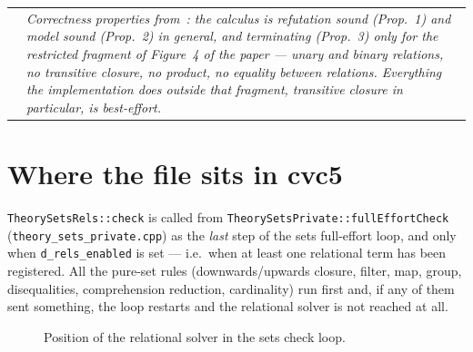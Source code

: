 \documentclass[11pt,a4paper]{article}
\makeatletter
\newcommand{\code}[1]{\texttt{\small #1}}
\newcommand{\file}[1]{\texttt{\small #1}}
\theoremstyle{definition}
\newenvironment{sidenote}
  {\par\medskip\noindent\begin{tabular}{@{}p{0.02\textwidth}@{\hspace{4pt}}p{0.93\textwidth}@{}}
   \raisebox{-1pt}{\color{hl}\Large$\vartriangleright$} &\itshape}
  {\end{tabular}\par\medskip}
\makeatother
\begin{document}
\begin{sidenote}
Correctness properties from~\cite{MRT17}: the calculus is refutation sound
(Prop.~1) and model sound (Prop.~2) in general, and terminating (Prop.~3) only
for the restricted fragment of Figure~4 of the paper --- unary and binary
relations, no transitive closure, no product, no equality between relations.
Everything the implementation does outside that fragment, transitive closure
in particular, is best-effort.
\end{sidenote}

\section{Where the file sits in cvc5}

\code{TheorySetsRels::check} is called from
\code{TheorySetsPrivate::fullEffortCheck} (\file{theory\_sets\_private.cpp}) as
the \emph{last} step of the sets full-effort loop, and only when
\code{d\_rels\_enabled} is set --- i.e.\ when at least one relational term has
been registered. All the pure-set rules (downwards\slash upwards closure,
filter, map, group, disequalities, comprehension reduction, cardinality) run
first and, if any of them sent something, the loop restarts and the relational
solver is not reached at all.

\begin{figure}[h]\centering
{}
\caption{Position of the relational solver in the sets check loop.}
\end{figure}
\end{document}
